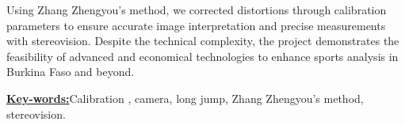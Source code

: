 Using Zhang Zhengyou's method, we corrected distortions through calibration parameters to ensure accurate image interpretation and precise measurements with stereovision. Despite the technical complexity, the project demonstrates the feasibility of advanced and economical technologies to enhance sports analysis in Burkina Faso and beyond.\par
\begin{spacing}{1}
\underline{\textbf{Key-words:}}Calibration , camera, long jump, Zhang Zhengyou's method, stereovision.\\
\end{spacing}
 


    